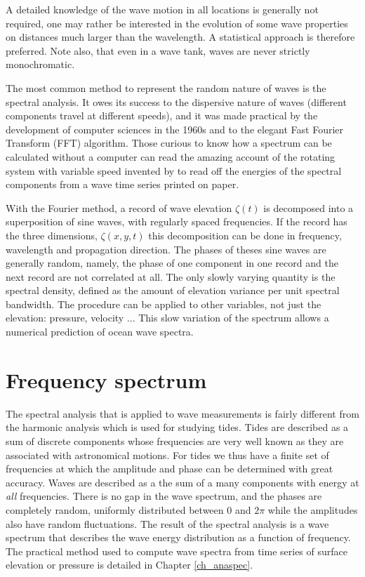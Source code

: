 A detailed knowledge of the wave motion in all locations is generally not required, 
one may rather be interested in the evolution of some wave properties on distances 
much larger than the wavelength.  A statistical approach is therefore preferred.
Note also, that even in a wave tank, waves are never strictly monochromatic.

The most common method to represent the random nature of waves is the spectral analysis. 
It owes its success to the dispersive nature of waves (different components travel at different speeds), and it was made practical by the 
development of computer sciences in the 1960s and to the elegant 
Fast Fourier Transform (FFT) algorithm.  Those curious to know how a spectrum can be calculated without a computer can read the amazing account 
of the rotating system with variable speed invented by  \cite{Barber&al.1946}  to read off the energies of the spectral components from a wave time series printed on paper.

With the Fourier method, a record of wave elevation $\zeta(t)$ is decomposed into 
a superposition of sine waves, with regularly spaced frequencies. If the record has the three dimensions, $\zeta(x,y,t)$ this decomposition can be 
done in frequency, wavelength and propagation direction. 
The phases of theses sine waves are generally random, namely, the phase of one component 
in one record and the next record are not correlated at all. The only slowly varying quantity 
is the spectral density, defined as the amount of elevation variance per unit spectral bandwidth. 
The procedure can be applied to other variables, not just the elevation: pressure, velocity ... 
This slow variation of the spectrum allows a numerical prediction of ocean wave spectra. 

\section{Frequency spectrum}
The spectral analysis that is applied to wave measurements is fairly different from the harmonic 
analysis which is used for studying tides. Tides are described as a sum of discrete components whose frequencies are very well known as 
they are associated with astronomical motions. For tides we thus have a finite set of frequencies at which the amplitude and phase 
can be determined with great accuracy. Waves are described as a the sum of a 
 many components with energy at \emph{all} frequencies. There is no gap in the wave spectrum, and the phases are completely random, uniformly 
distributed between 0 and $2 \pi$ while the amplitudes 
also have random fluctuations. The result of the spectral analysis is a wave spectrum that describes
the wave energy distribution as a function of frequency. The practical method used to compute wave 
spectra from time series of surface elevation or pressure is detailed in Chapter \ref{ch_anaspec}. 

